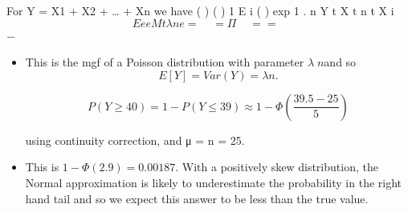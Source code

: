 \documentclass[a4paper,12pt]{article}
\begin{document}
\begin{enumerate}
\begin{itemize}
For Y = X1 + X2 + … + Xn we have
( ) ( )
1
E i ( ) exp 1 .
n
Y t X t n t
X
i
\[E e e M t \lambda n e
=
    =Π   = = \] − 
\end{itemize}



\begin{itemize}
\item This is the mgf of a Poisson distribution with parameter $\lambda\;n$and so 
\[E[Y] = Var(Y) = \lambda n.\]

\[P (Y \geq 40) = 1− P(Y \leq 39) \approx 1 - \Phi(\frac{39.5-25}{5})\]

using continuity correction, and μ = \lambda n = 25. 
\item This is $1−\Phi(2.9) = 0.00187$.
With a positively skew distribution, the Normal approximation is likely to
underestimate the probability in the right hand tail and so we expect this answer to be
less than the true value.
\end{itemize}
\end{enumerate}
\end{document}
